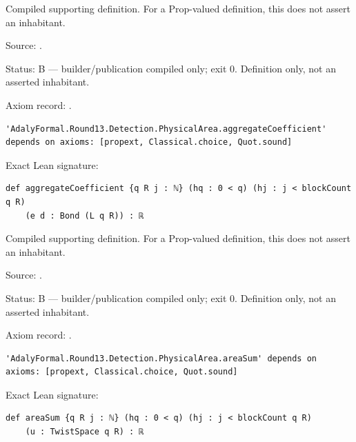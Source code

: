\begin{definition}[bp-540]
\label{bp-540}
\uses{}
\leanok
Compiled supporting definition. For a Prop-valued definition, this does not assert an inhabitant.

\par Source: \texttt{}.
\par Status: B — builder/publication compiled only; exit 0. Definition only, not an asserted inhabitant.
\par Axiom record: \texttt{}.
\begin{verbatim}
'AdalyFormal.Round13.Detection.PhysicalArea.aggregateCoefficient' depends on axioms: [propext, Classical.choice, Quot.sound]
\end{verbatim}
\par Exact Lean signature:
\begin{verbatim}
def aggregateCoefficient {q R j : ℕ} (hq : 0 < q) (hj : j < blockCount q R)
    (e d : Bond (L q R)) : ℝ
\end{verbatim}
\end{definition}

\begin{definition}[bp-541]
\label{bp-541}
\leanok
Compiled supporting definition. For a Prop-valued definition, this does not assert an inhabitant.

\par Source: \texttt{}.
\par Status: B — builder/publication compiled only; exit 0. Definition only, not an asserted inhabitant.
\par Axiom record: \texttt{}.
\begin{verbatim}
'AdalyFormal.Round13.Detection.PhysicalArea.areaSum' depends on axioms: [propext, Classical.choice, Quot.sound]
\end{verbatim}
\par Exact Lean signature:
\begin{verbatim}
def areaSum {q R j : ℕ} (hq : 0 < q) (hj : j < blockCount q R)
    (u : TwistSpace q R) : ℝ
\end{verbatim}
\end{definition}

